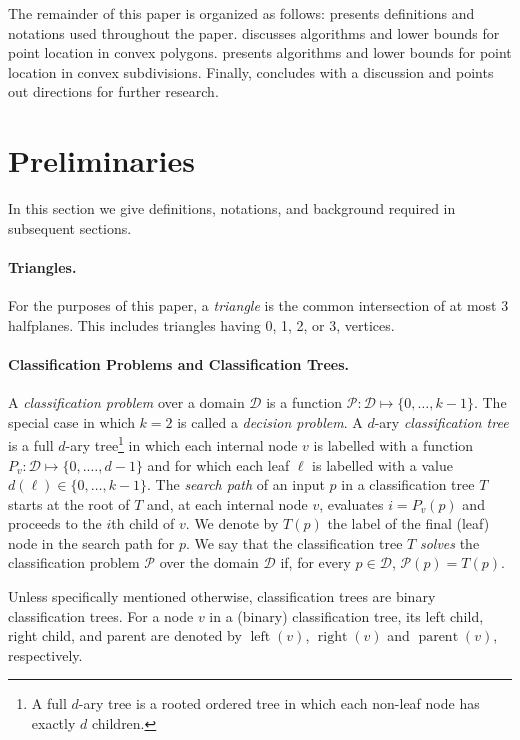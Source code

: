 \documentclass[charterfonts,lotsofwhite]{patmorin}
\DeclareMathOperator{\lft}{left}
\DeclareMathOperator{\rght}{right}
\DeclareMathOperator{\prnt}{parent}
\begin{document}
The remainder of this paper is organized as follows:  
presents definitions and notations used throughout the paper.
 discusses algorithms and lower bounds for point
location in convex polygons.   presents algorithms
and lower bounds for point location in convex subdivisions.  Finally,
 concludes with a discussion and points out
directions for further research.


\section{Preliminaries}

In this section we give definitions, notations, and background
required in subsequent sections.

\paragraph{Triangles.}  For the purposes of this paper, a
\emph{triangle} is the common intersection of at most 3 halfplanes.
This includes triangles having 0, 1, 2, or 3, vertices.  

\paragraph{Classification Problems and Classification Trees.}

A \emph{classification problem} over a domain $\mathcal{D}$ is a
function $\mathcal{P}:\mathcal{D}\mapsto \{0,\ldots,k-1\}$.  The
special case in which $k=2$ is called a \emph{decision problem}.  A
$d$-ary \emph{classification tree} is a full $d$-ary tree\footnote{A
full $d$-ary tree is a rooted ordered tree in which each non-leaf node
has exactly $d$ children.} in which each internal node $v$ is labelled
with a function $P_v:\mathcal{D}\mapsto\{0,.\ldots,d-1\}$ and for
which each leaf $\ell$ is labelled with a value
$d(\ell)\in\{0,\ldots,k-1\}$. The \emph{search path} of an input $p$
in a classification tree $T$ starts at the root of $T$ and, at each
internal node $v$, evaluates $i=P_v(p)$ and proceeds to the $i$th
child of $v$.  We denote by $T(p)$ the label of the final (leaf) node
in the search path for $p$.  We say that the classification tree $T$
\emph{solves} the classification problem $\mathcal{P}$ over the domain
$\mathcal{D}$ if, for every $p\in \mathcal{D}$, $\mathcal{P}(p)=T(p)$.

Unless specifically mentioned otherwise, classification trees are
binary classification trees.  For a node $v$ in a (binary)
classification tree, its left child, right child, and parent are
denoted by $\lft(v)$, $\rght(v)$ and $\prnt(v)$, respectively.
\end{document}
